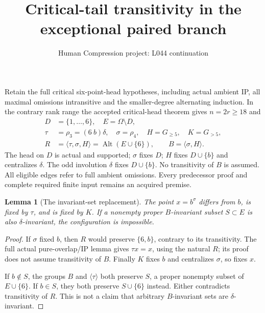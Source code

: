 \documentclass[11pt,a4paper]{article}
\title{Critical-tail transitivity in the exceptional paired branch}
\author{Human Compression project: L044 continuation}
\date{}
\newtheorem{lemma}{Lemma}
\newcommand{\gen}[1]{\langle#1\rangle}
\newcommand{\Alt}{\operatorname{Alt}}
\begin{document}
\maketitle
Retain the full critical six-point-head hypotheses, including actual
ambient IP, all maximal omissions intransitive and the smaller-degree
alternating induction. In the contrary rank range the accepted
critical-head theorem gives $n=2r\ge18$ and
\[
\begin{split}
 D&=\{1,\ldots,6\},\quad E=\Omega\setminus D,\\
 \tau&=\rho_3=(6\ b)\delta,\quad
 \sigma=\rho_4,\quad H=G_{\ge5},\quad K=G_{>5},\\
 R&=\gen{\tau,\sigma,H}=\Alt(E\cup\{6\}),\qquad
 B=\gen{\sigma,H}.
\end{split}
\]
The head on $D$ is actual and supported; $\sigma$ fixes $D$;
$H$ fixes $D\cup\{b\}$ and centralizes $\delta$.
The odd involution $\delta$ fixes $D\cup\{b\}$.
No transitivity of $B$ is assumed. All eligible edges refer to
full ambient omissions. Every predecessor proof and complete
required finite input remains an acquired premise.

\begin{lemma}[The invariant-set replacement]\label{bridge}
The point $x=b^\sigma$ differs from $b$, is fixed by $\tau$, and
is fixed by $K$. If a nonempty proper $B$-invariant subset
$S\subset E$ is also $\delta$-invariant, the configuration is
impossible.
\end{lemma}
\begin{proof}
If $\sigma$ fixed $b$, then $R$ would preserve $\{6,b\}$,
contrary to its transitivity. The full actual pure-overlap/IP
lemma gives $\tau x=x$, using the natural $R$; its proof does
not assume transitivity of $B$. Finally $K$ fixes $b$ and
centralizes $\sigma$, so fixes $x$.

If $b\notin S$, the groups $B$ and $\gen\tau$ both preserve
$S$, a proper nonempty subset of $E\cup\{6\}$.
If $b\in S$, they both preserve $S\cup\{6\}$ instead.
Either contradicts transitivity of $R$. This is not a claim
that arbitrary $B$-invariant sets are $\delta$-invariant.
\end{proof}
\end{document}
